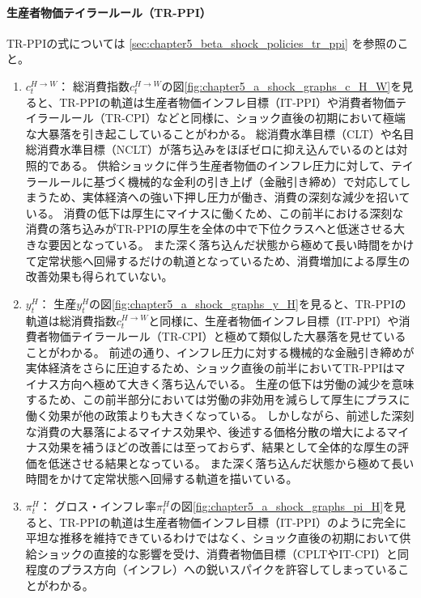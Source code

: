 \paragraph{生産者物価テイラールール（TR-PPI）}
\label{sec:chapter5_a_shock_policies_tr_ppi}
TR-PPIの式については
\ref{sec:chapter5_beta_shock_policies_tr_ppi}
を参照のこと。
\begin{enumerate}
    \item
    \label{itm:chapter5_a_shock_policies_tr_ppi_c_H_W}
        \(c_t^{H\to W}\)：
        総消費指数\(c_t^{H\to W}\)の図\ref{fig:chapter5_a_shock_graphs_c_H_W}を見ると、TR-PPIの軌道は生産者物価インフレ目標（IT-PPI）や消費者物価テイラールール（TR-CPI）などと同様に、ショック直後の初期において極端な大暴落を引き起こしていることがわかる。
        総消費水準目標（CLT）や名目総消費水準目標（NCLT）が落ち込みをほぼゼロに抑え込んでいるのとは対照的である。
        供給ショックに伴う生産者物価のインフレ圧力に対して、テイラールールに基づく機械的な金利の引き上げ（金融引き締め）で対応してしまうため、実体経済への強い下押し圧力が働き、消費の深刻な減少を招いている。
        消費の低下は厚生にマイナスに働くため、この前半における深刻な消費の落ち込みがTR-PPIの厚生を全体の中で下位クラスへと低迷させる大きな要因となっている。
        また深く落ち込んだ状態から極めて長い時間をかけて定常状態へ回帰するだけの軌道となっているため、消費増加による厚生の改善効果も得られていない。
    \item
    \label{itm:chapter5_a_shock_policies_tr_ppi_y_H}
        \(y_t^H\)：
        生産\(y_t^H\)の図\ref{fig:chapter5_a_shock_graphs_y_H}を見ると、TR-PPIの軌道は総消費指数\(c_t^{H\to W}\)と同様に、生産者物価インフレ目標（IT-PPI）や消費者物価テイラールール（TR-CPI）と極めて類似した大暴落を見せていることがわかる。
        前述の通り、インフレ圧力に対する機械的な金融引き締めが実体経済をさらに圧迫するため、ショック直後の前半においてTR-PPIはマイナス方向へ極めて大きく落ち込んでいる。
        生産の低下は労働の減少を意味するため、この前半部分においては労働の非効用を減らして厚生にプラスに働く効果が他の政策よりも大きくなっている。
        しかしながら、前述した深刻な消費の大暴落によるマイナス効果や、後述する価格分散の増大によるマイナス効果を補うほどの改善には至っておらず、結果として全体的な厚生の評価を低迷させる結果となっている。
        また深く落ち込んだ状態から極めて長い時間をかけて定常状態へ回帰する軌道を描いている。
    \item
    \label{itm:chapter5_a_shock_policies_tr_ppi_pi_H}
        \(\pi_t^H\)：
        グロス・インフレ率\(\pi_t^H\)の図\ref{fig:chapter5_a_shock_graphs_pi_H}を見ると、TR-PPIの軌道は生産者物価インフレ目標（IT-PPI）のように完全に平坦な推移を維持できているわけではなく、ショック直後の初期において供給ショックの直接的な影響を受け、消費者物価目標（CPLTやIT-CPI）と同程度のプラス方向（インフレ）への鋭いスパイクを許容してしまっていることがわかる。

\end{enumerate}

